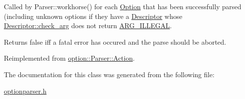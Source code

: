 Called by Parser\+::workhorse() for each \hyperlink{classoption_1_1_option}{Option} that has been successfully parsed (including unknown options if they have a \hyperlink{structoption_1_1_descriptor}{Descriptor} whose \hyperlink{structoption_1_1_descriptor_aa5d675dba0214a4abd73007ff163cc67}{Descriptor\+::check\+\_\+arg} does not return \hyperlink{namespaceoption_aee8c76a07877335762631491e7a5a1a9a9528e32563b795bd2930b12d0a5e382d}{A\+R\+G\+\_\+\+I\+L\+L\+E\+G\+AL}. 

Returns {\ttfamily false} iff a fatal error has occured and the parse should be aborted. 

Reimplemented from \hyperlink{structoption_1_1_parser_1_1_action_a176b5f783bb35eb015b6d2c09422457d}{option\+::\+Parser\+::\+Action}.



The documentation for this class was generated from the following file\+:\begin{DoxyCompactItemize}
\item 
\hyperlink{optionparser_8h}{optionparser.\+h}\end{DoxyCompactItemize}
